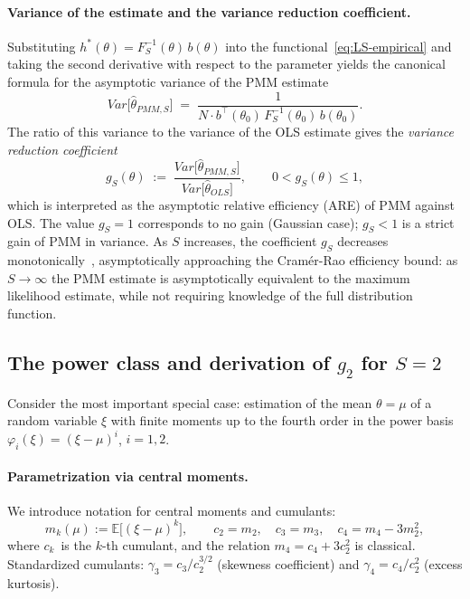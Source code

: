 \documentclass[11pt]{article}
\def\vec#1{#1}%
\def\mathbf#1{#1}%
\def\mathrm#1{#1}%
\theoremstyle{definition}
\newcommand{\E}{\mathbb{E}}
\newcommand{\Var}{\mathrm{Var}}
\newcommand{\PMM}{\mathrm{PMM}}
\begin{document}
\paragraph{Variance of the estimate and the variance reduction coefficient.}
Substituting $\vec h^{*}(\theta) = \mathbf{F}_S^{-1}(\theta)\,\vec b(\theta)$
into the functional~\eqref{eq:LS-empirical} and taking the second derivative
with respect to the parameter yields the canonical formula for the asymptotic
variance of the PMM estimate~\citep[ch.~3.4]{kunchenko2002}
\begin{equation}\label{eq:var-pmm-canonical}
  \Var\bigl[\hat\theta_{\PMM,S}\bigr]
  \;=\; \frac{1}{N \cdot
                \vec b^{\top}(\theta_0)\,
                \mathbf{F}_S^{-1}(\theta_0)\,
                \vec b(\theta_0)}.
\end{equation}
The ratio of this variance to the variance of the OLS estimate gives the
\emph{variance reduction coefficient}
\begin{equation}\label{eq:gS-def}
  g_S(\theta)
  \;:=\; \frac{\Var\!\bigl[\hat\theta_{\PMM,S}\bigr]}
              {\Var\!\bigl[\hat\theta_{\mathrm{OLS}}\bigr]},
  \qquad 0 < g_S(\theta) \leq 1,
\end{equation}
which is interpreted as the asymptotic relative efficiency (ARE) of PMM
against OLS. The value $g_S = 1$ corresponds to no gain (Gaussian case);
$g_S < 1$ is a strict gain of PMM in variance. As $S$ increases, the
coefficient $g_S$ decreases
monotonically~\citep[ch.~3.5]{kunchenko2002}, asymptotically approaching
the Cramér-Rao efficiency bound: as $S \to \infty$ the PMM estimate is
asymptotically equivalent to the maximum likelihood estimate, while not
requiring knowledge of the full distribution function.

\subsection[The power class and derivation of g2 for S = 2]{The power class and derivation of $g_2$ for $S = 2$}\label{sec:bg:integer}

Consider the most important special case: estimation of the mean
$\theta = \mu$ of a random variable $\xi$ with finite moments up to the
fourth order in the power basis $\varphi_i(\xi) = (\xi - \mu)^i$,
$i = 1, 2$.

\paragraph{Parametrization via central moments.}
We introduce notation for central moments and cumulants:
\begin{equation}\label{eq:moments-cumulants}
  m_k(\mu) := \E\bigl[(\xi - \mu)^k\bigr], \qquad
  c_2 = m_2, \quad c_3 = m_3, \quad c_4 = m_4 - 3 m_2^2,
\end{equation}
where $c_k$~is the $k$-th cumulant, and the relation $m_4 = c_4 + 3 c_2^2$
is classical. Standardized cumulants:
$\gamma_3 = c_3 / c_2^{3/2}$ (skewness coefficient) and
$\gamma_4 = c_4 / c_2^2$ (excess kurtosis).
\end{document}
